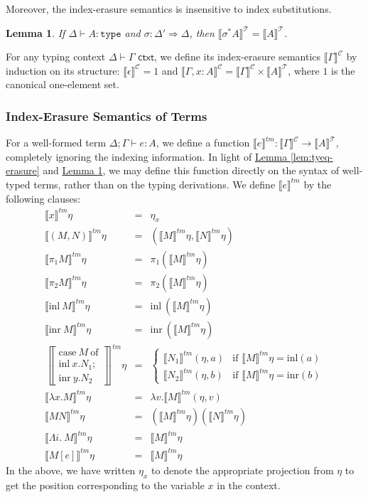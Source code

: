 \documentclass[natbib,preprint]{sigplanconf}
\newcommand{\sortType}{\texttt{type}}
\newcommand{\isCtxt}{\textsf{ ctxt}}
\newcommand{\tySem}[1]{\llbracket #1 \rrbracket^{\mathcal{T}}}
\newcommand{\ctxtSem}[1]{\llbracket #1 \rrbracket^{\mathcal{C}}}
\newcommand{\tmSem}[1]{\llbracket #1 \rrbracket^{\mathit{tm}}}
\newtheorem{lemma}{Lemma}
\newcommand{\lemref}[1]{\hyperref[#1]{Lemma \ref*{#1}}}
\begin{document}
Moreover, the index-erasure semantics is insensitive to index
substitutions.
\begin{lemma}\label{lem:tysubst-erasure}
  If $\Delta \vdash A : \sortType$ and $\sigma : \Delta' \Rightarrow
  \Delta$, then $\tySem{\sigma^*A} = \tySem{A}$.
\end{lemma}

For any typing context $\Delta \vdash \Gamma \isCtxt$, we define its
index-erasure semantics $\ctxtSem{\Gamma}$ by induction on its
structure: $\ctxtSem{\epsilon} = 1$ and $\ctxtSem{\Gamma, x : A} =
\ctxtSem{\Gamma} \times \tySem{A}$, where $1$ is the canonical
one-element set.

\subsubsection{Index-Erasure Semantics of Terms}

For a well-formed term $\Delta; \Gamma \vdash e : A$, we define a
function $\tmSem{e} : \ctxtSem{\Gamma} \to \tySem{A}$, completely
ignoring the indexing information. In light of
\lemref{lem:tyeq-erasure} and \lemref{lem:tysubst-erasure}, we may
define this function directly on the syntax of well-typed terms,
rather than on the typing derivations. We define $\tmSem{e}$ by the
following clauses:
\begin{eqnarray*}
  \tmSem{x}\eta & = & \eta_x \\
  \tmSem{(M,N)}\eta & = & (\tmSem{M}\eta, \tmSem{N}\eta) \\
  \tmSem{\pi_1M}\eta & = & \pi_1(\tmSem{M}\eta) \\
  \tmSem{\pi_2M}\eta & = & \pi_2(\tmSem{M}\eta) \\
  \tmSem{\mathrm{inl}\ M}\eta & = & \mathrm{inl}\ (\tmSem{M}\eta) \\
  \tmSem{\mathrm{inr}\ M}\eta & = & \mathrm{inr}\ (\tmSem{M}\eta) \\
  \left\llbracket
    \begin{array}{l}
      \textrm{case}\ M\ \textrm{of}\\
      \textrm{inl}\ x.N_1;\\
      \textrm{inr}\ y.N_2
    \end{array}\right\rrbracket^{\mathit{tm}}\eta & = &
  \left\{
    \begin{array}{ll}
      \tmSem{N_1}(\eta,a) & \textrm{if }\tmSem{M}\eta = \mathrm{inl}(a) \\
      \tmSem{N_2}(\eta,b) & \textrm{if }\tmSem{M}\eta = \mathrm{inr}(b)
    \end{array}
  \right. \\
  \tmSem{\lambda x. M}\eta & = & \lambda v. \tmSem{M}(\eta, v) \\
  \tmSem{M N}\eta & = & (\tmSem{M}\eta) (\tmSem{N}\eta) \\
  \tmSem{\Lambda i.\ M}\eta & = & \tmSem{M}\eta \\
  \tmSem{M[e]}\eta & = & \tmSem{M}\eta
\end{eqnarray*}
In the above, we have written $\eta_x$ to denote the appropriate
projection from $\eta$ to get the position corresponding to the
variable $x$ in the context.
\end{document}
